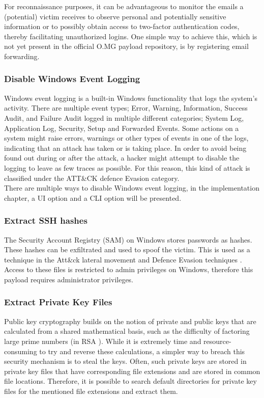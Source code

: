 For reconnaissance purposes, it can be advantageous to monitor the emails a (potential) victim receives to observe personal and potentially sensitive information or to possibly obtain access to two-factor authentication codes, thereby facilitating unauthorized logins. One simple way to achieve this, which is not yet present in the official O.MG payload repository, is by registering email forwarding. 


\subsubsection{Disable Windows Event Logging}

Windows event logging is a built-in Windows functionality that logs the system's activity. There are multiple event types; Error, Warning, Information, Success Audit, and Failure Audit logged in multiple different categories; System Log, Application Log, Security, Setup and Forwarded Events. 
Some actions on a system might raise errors, warnings or other types of events in one of the logs, indicating that an attack has taken or is taking place. In order to avoid being found out during or after the attack, a hacker might attempt to disable the logging to leave as few traces as possible. For this reason, this kind of attack is classified under the ATT\&CK defence Evasion category. \\
There are multiple ways to disable Windows event logging, in the implementation chapter, a UI option and a CLI option will be presented. 


\subsubsection{Extract SSH hashes}

The Security Account Registry (SAM) on Windows stores passwords as hashes. These hashes can be exfiltrated and used to spoof the victim. This is used as a technique in the Att\&ck lateral movement and Defence Evasion techniques \cite{UseAlternateAuthentication}. \\
Access to these files is restricted to admin privileges on Windows, therefore this payload requires administrator privileges.

\subsubsection{Extract Private Key Files}

Public key cryptography builds on the notion of private and public keys that are calculated from a shared mathematical basis, such as the difficulty of factoring large prime numbers (in RSA \cite{rivestMethodObtainingDigital1978}). While it is extremely time and resource-consuming to try and reverse these calculations, a simpler way to breach this security mechanism is to steal the keys. Often, such private keys are stored in private key files that have corresponding file extensions and are stored in common file locations. Therefore, it is possible to search default directories for private key files for the mentioned file extensions and extract them.    


